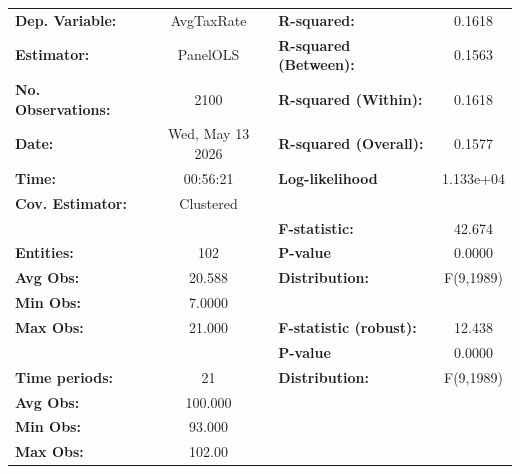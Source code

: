 \begin{center}
\begin{tabular}{lclc}
\toprule
\textbf{Dep. Variable:}                       &     AvgTaxRate     & \textbf{  R-squared:         }   &      0.1618      \\
\textbf{Estimator:}                           &      PanelOLS      & \textbf{  R-squared (Between):}  &      0.1563      \\
\textbf{No. Observations:}                    &        2100        & \textbf{  R-squared (Within):}   &      0.1618      \\
\textbf{Date:}                                &  Wed, May 13 2026  & \textbf{  R-squared (Overall):}  &      0.1577      \\
\textbf{Time:}                                &      00:56:21      & \textbf{  Log-likelihood     }   &    1.133e+04     \\
\textbf{Cov. Estimator:}                      &     Clustered      & \textbf{                     }   &                  \\
\textbf{}                                     &                    & \textbf{  F-statistic:       }   &      42.674      \\
\textbf{Entities:}                            &        102         & \textbf{  P-value            }   &      0.0000      \\
\textbf{Avg Obs:}                             &       20.588       & \textbf{  Distribution:      }   &    F(9,1989)     \\
\textbf{Min Obs:}                             &       7.0000       & \textbf{                     }   &                  \\
\textbf{Max Obs:}                             &       21.000       & \textbf{  F-statistic (robust):} &      12.438      \\
\textbf{}                                     &                    & \textbf{  P-value            }   &      0.0000      \\
\textbf{Time periods:}                        &         21         & \textbf{  Distribution:      }   &    F(9,1989)     \\
\textbf{Avg Obs:}                             &      100.000       & \textbf{                     }   &                  \\
\textbf{Min Obs:}                             &       93.000       & \textbf{                     }   &                  \\
\textbf{Max Obs:}                             &       102.00       & \textbf{                     }   &                  \\

\end{tabular}
\end{center}

